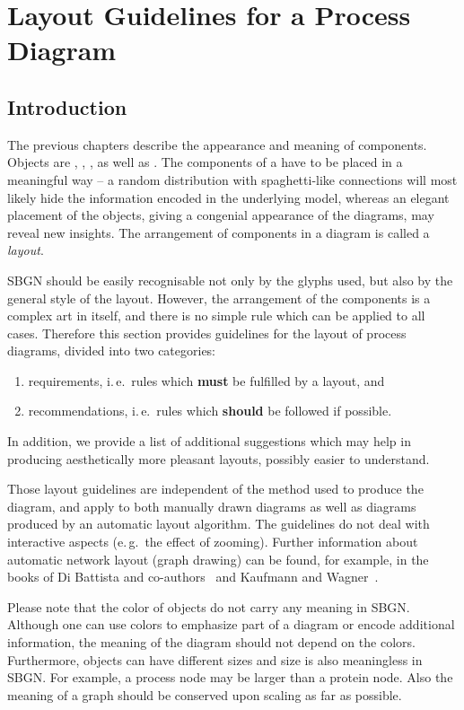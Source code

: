 	\chapter{Layout Guidelines for a Process Diagram}
\label{chp:layout}

\section{Introduction}

The previous chapters describe the appearance and meaning of
\SBGNPDLone components. Objects are , , 
,  as well as . The components of a \PD
have to be placed in a meaningful way -- a random
distribution with spaghetti-like connections will most likely hide
the information encoded in the underlying model, whereas an elegant
placement of the objects, giving a congenial appearance of the
diagrams, may reveal new insights. The arrangement of components in a
diagram is called a \emph{layout}.

SBGN \PDs should be easily recognisable not only by the
glyphs used, but also by the general style of the layout. However, the
arrangement of the components is a complex art in itself, and there is
no simple rule which can be applied to all cases. Therefore this
section provides guidelines for the layout of process diagrams, divided
into two categories:
\begin{enumerate}
  \item requirements, i.\,e.~rules which \textbf{must} be fulfilled by a
  layout, and
  \item recommendations, i.\,e.~rules which \textbf{should} be followed if
  possible. 
\end{enumerate}
In addition, we provide a list of additional suggestions which may help in producing aesthetically more pleasant layouts, possibly easier to understand.

Those layout guidelines are independent of the method used to produce
the diagram, and apply to both manually drawn diagrams as well as
diagrams produced by an automatic layout algorithm. The guidelines do
not deal with interactive aspects (e.\,g.~the effect of zooming). Further information about automatic network layout
(graph drawing) can be found, for example, in the books of Di Battista and
co-authors~\cite{DiBattista:1998} and Kaufmann and Wagner~\cite{Kaufmann:2001}.

Please note that the color of objects do not carry any meaning in
SBGN. Although one can use colors to emphasize part of a diagram or
encode additional information, the meaning of the diagram should not
depend on the colors. Furthermore, objects can have different sizes
and size is also meaningless in SBGN. For example, a process node
may be larger than a protein node. Also the meaning of a graph
should be conserved upon scaling as far as possible.

